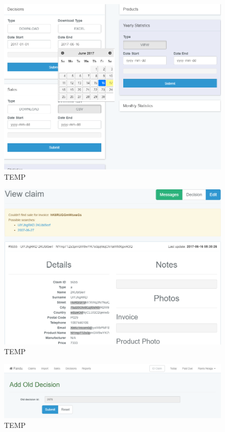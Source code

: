 	\begin{figure}
		\includegraphics[width=\linewidth]{../imagini/claims_reports.png}
		\caption{TEMP}
		\label{fig:TEMP}
	\end{figure}
	\begin{figure}
		\includegraphics[width=\linewidth]{../imagini/claims_view.png}
		\caption{TEMP}
		\label{fig:TEMP}
	\end{figure}
	\begin{figure}
		\includegraphics[width=\linewidth]{../imagini/decisions_add_conirm.png}
		\caption{TEMP}
		\label{fig:TEMP}
	\end{figure}
